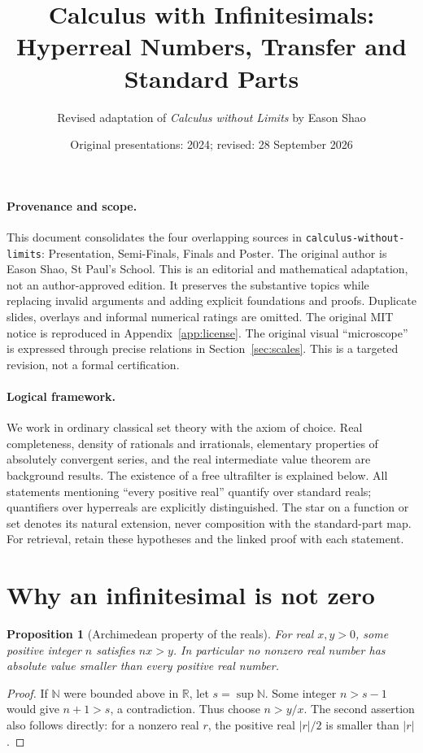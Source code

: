 \documentclass[11pt]{article}
\title{Calculus with Infinitesimals:\\Hyperreal Numbers, Transfer and Standard Parts}
\author{Revised adaptation of \emph{Calculus without Limits} by Eason Shao}
\date{Original presentations: 2024; revised: 28 September 2026}
\newtheorem{proposition}[theorem]{Proposition}
\theoremstyle{definition}
\theoremstyle{remark}
\newcommand{\RR}{\mathbb R}
\newcommand{\NN}{\mathbb N}
\begin{document}
\maketitle
\paragraph{Provenance and scope.}
This document consolidates the four overlapping sources in
\texttt{calculus-without-limits}: Presentation, Semi-Finals, Finals and Poster.
The original author is Eason Shao, St Paul's School. This is an editorial and
mathematical adaptation, not an author-approved edition. It preserves the
substantive topics while replacing invalid arguments and adding explicit
foundations and proofs. Duplicate slides, overlays and informal numerical ratings
are omitted. The original MIT notice is reproduced in Appendix~\ref{app:license}.
The original visual ``microscope'' is expressed through precise relations in
Section~\ref{sec:scales}. This is a targeted revision, not a formal certification.
\paragraph{Logical framework.}
We work in ordinary classical set theory with the axiom of choice. Real
completeness, density of rationals and irrationals, elementary properties of
absolutely convergent series, and the real intermediate value theorem are
background results. The existence of a free ultrafilter is explained below.
All statements mentioning ``every positive real'' quantify over standard reals;
quantifiers over hyperreals are explicitly distinguished. The star on a function
or set denotes its natural extension, never composition with the standard-part map.
For retrieval, retain these hypotheses and the linked proof with each statement.
\tableofcontents

\section{Why an infinitesimal is not zero}
\begin{proposition}[Archimedean property of the reals]\label{prop:archimedean}
For real \(x,y>0\), some positive integer \(n\) satisfies \(nx>y\).
In particular no nonzero real number has absolute value smaller than every
positive real number.
\end{proposition}
\begin{proof}
If \(\NN\) were bounded above in \(\RR\), let \(s=\sup\NN\). Some integer
\(n>s-1\) would give \(n+1>s\), a contradiction. Thus choose \(n>y/x\).
The second assertion also follows directly: for a nonzero real \(r\), the
positive real \(|r|/2\) is smaller than \(|r|\).
\end{proof}
\end{document}
